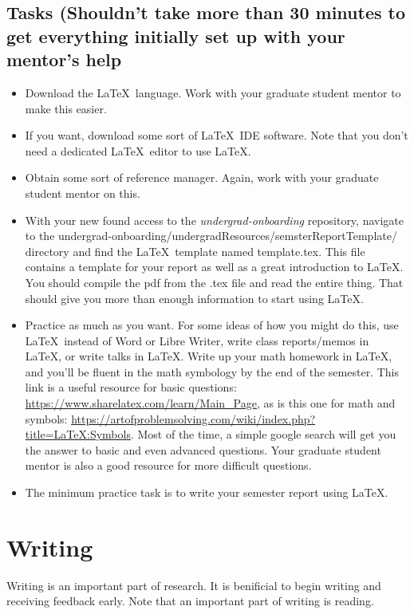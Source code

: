 \documentclass[]{article}%
\begin{document}
\subsection{Tasks (Shouldn't take more than 30 minutes to get everything initially set up with your mentor's help}
\begin{itemize}
	\item Download the \LaTeX~language.  Work with your graduate student mentor to make this easier. 
	\item If you want, download some sort of \LaTeX~IDE software. Note that you don't need a dedicated \LaTeX~editor to use \LaTeX. 
	\item Obtain some sort of reference manager. Again, work with your graduate student mentor on this.
	\item With your new found access to the  \textit{undergrad-onboarding} repository, navigate to the undergrad-onboarding/undergradResources/semsterReportTemplate/ directory and find the \LaTeX~template named template.tex.  This file contains a template for your report as well as a great introduction to \LaTeX.  You should compile the pdf from the .tex file and read the entire thing.  That should give you more than enough information to start using \LaTeX.
	\item Practice as much as you want. For some ideas of how you might do this, use \LaTeX~instead of Word or Libre Writer, write class reports/memos in \LaTeX, or write talks in \LaTeX. Write up your math homework in \LaTeX, and you'll be fluent in the math symbology by the end of the semester. This link is a useful resource for basic questions: \url{https://www.sharelatex.com/learn/Main_Page}, as is this one for math and symbols: \url{https://artofproblemsolving.com/wiki/index.php?title=LaTeX:Symbols}.  Most of the time, a simple google search will get you the answer to basic and even advanced questions. Your graduate student mentor is also a good resource for more difficult questions.
	\item The minimum practice task is to write your semester report using \LaTeX.
\end{itemize}


\section{Writing}
Writing is an important part of research.  It is benificial to begin writing and receiving feedback early.  Note that an important part of writing is reading.
\end{document}
